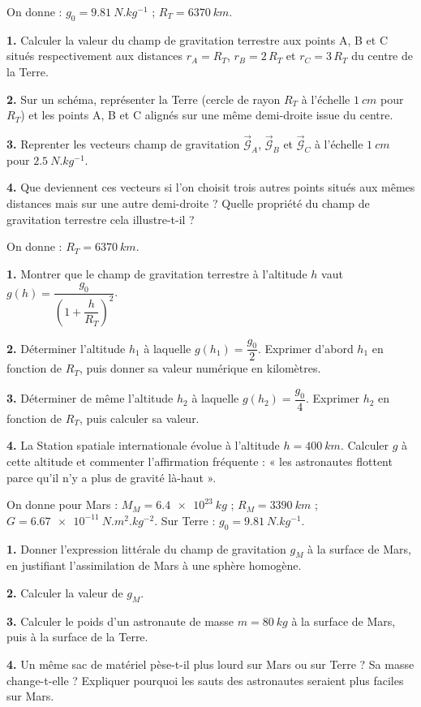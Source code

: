 \documentclass[11pt]{article}
\newcounter{popsec}
\newcounter{popsub}
\newcommand{\courssub}[1]{%
  \stepcounter{popsub}%
  \par\vspace{9pt}\noindent{\popxbold\fontsize{11.5}{13}\selectfont\color{popink}{\color{poporange}\thepopsec.\thepopsub}\hspace{6pt}#1}\par\nopagebreak\vspace{4pt}
}
\begin{document}
\courssub{Je m'entraîne}

\begin{exercice}
On donne : $g_0 = \SI{9,81}{N.kg^{-1}}$ ; $R_T = \SI{6370}{km}$.

\textbf{1.} Calculer la valeur du champ de gravitation terrestre aux points A, B et C situés respectivement aux distances $r_A = R_T$, $r_B = 2\,R_T$ et $r_C = 3\,R_T$ du centre de la Terre.

\textbf{2.} Sur un schéma, représenter la Terre (cercle de rayon $R_T$ à l'échelle $\SI{1}{cm}$ pour $R_T$) et les points A, B et C alignés sur une même demi-droite issue du centre.

\textbf{3.} Reprenter les vecteurs champ de gravitation $\vec{\mathcal{G}}_A$, $\vec{\mathcal{G}}_B$ et $\vec{\mathcal{G}}_C$ à l'échelle $\SI{1}{cm}$ pour $\SI{2,5}{N.kg^{-1}}$.

\textbf{4.} Que deviennent ces vecteurs si l'on choisit trois autres points situés aux mêmes distances mais sur une autre demi-droite ? Quelle propriété du champ de gravitation terrestre cela illustre-t-il ?
\end{exercice}

\begin{exercice}
On donne : $R_T = \SI{6370}{km}$.

\textbf{1.} Montrer que le champ de gravitation terrestre à l'altitude $h$ vaut $g(h) = \dfrac{g_0}{\left(1 + \dfrac{h}{R_T}\right)^2}$.

\textbf{2.} Déterminer l'altitude $h_1$ à laquelle $g(h_1) = \dfrac{g_0}{2}$. Exprimer d'abord $h_1$ en fonction de $R_T$, puis donner sa valeur numérique en kilomètres.

\textbf{3.} Déterminer de même l'altitude $h_2$ à laquelle $g(h_2) = \dfrac{g_0}{4}$. Exprimer $h_2$ en fonction de $R_T$, puis calculer sa valeur.

\textbf{4.} La Station spatiale internationale évolue à l'altitude $h = \SI{400}{km}$. Calculer $g$ à cette altitude et commenter l'affirmation fréquente : « les astronautes flottent parce qu'il n'y a plus de gravité là-haut ».
\end{exercice}

\begin{exercice}
On donne pour Mars : $M_M = \SI{6,4e23}{kg}$ ; $R_M = \SI{3390}{km}$ ; $G = \SI{6,67e-11}{N.m^2.kg^{-2}}$. Sur Terre : $g_0 = \SI{9,81}{N.kg^{-1}}$.

\textbf{1.} Donner l'expression littérale du champ de gravitation $g_M$ à la surface de Mars, en justifiant l'assimilation de Mars à une sphère homogène.

\textbf{2.} Calculer la valeur de $g_M$.

\textbf{3.} Calculer le poids d'un astronaute de masse $m = \SI{80}{kg}$ à la surface de Mars, puis à la surface de la Terre.

\textbf{4.} Un même sac de matériel pèse-t-il plus lourd sur Mars ou sur Terre ? Sa masse change-t-elle ? Expliquer pourquoi les sauts des astronautes seraient plus faciles sur Mars.
\end{exercice}
\end{document}
